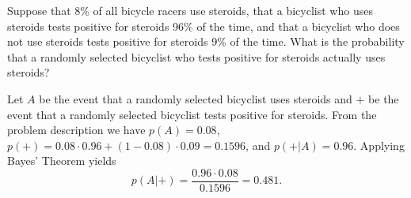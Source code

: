 \documentclass[../main.tex]{subfiles}
\begin{document}
Suppose that 8\% of all bicycle racers use steroids, that a bicyclist who uses steroids tests positive for steroids 96\% of the time, and that a bicyclist who does not use steroids tests positive for steroids 9\% of the time.
What is the probability that a randomly selected bicyclist who tests positive for steroids actually uses steroids?

\solution

Let $A$ be the event that a randomly selected bicyclist uses steroids and $+$ be the event that a randomly selected bicyclist tests positive for steroids.
From the problem description we have $p(A) = 0.08$, $p(+) = 0.08\cdot 0.96 + (1-0.08)\cdot 0.09 = 0.1596$, and $p(+|A) = 0.96$.
Applying Bayes' Theorem yields
\[ p(A|+) = \frac{0.96 \cdot 0.08}{0.1596} = 0.481. \]
\end{document}
